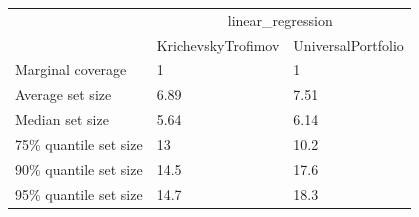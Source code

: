 \begin{tabular}{lll}
\toprule
& \multicolumn{2}{c}{linear_regression} \\
& KrichevskyTrofimov & UniversalPortfolio \\
\midrule
Marginal coverage & 1 & 1 \\
Average set size & 6.89 & 7.51 \\
Median set size & 5.64 & 6.14 \\
75\% quantile set size & 13 & 10.2 \\
90\% quantile set size & 14.5 & 17.6 \\
95\% quantile set size & 14.7 & 18.3 \\
\bottomrule
\end{tabular}
